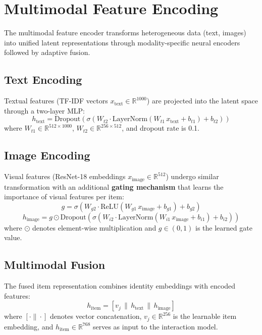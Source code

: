 \documentclass[12pt,a4paper]{report}
\begin{document}
{\section{Multimodal Feature Encoding}
The multimodal feature encoder transforms heterogeneous data (text, images) into unified latent representations through modality-specific neural encoders followed by adaptive fusion.

\subsection{Text Encoding}
Textual features (TF-IDF vectors $x_{\text{text}} \in \mathbb{R}^{1000}$) are projected into the latent space through a two-layer MLP:
\begin{equation}
h_{\text{text}} = \text{Dropout}(\sigma(W_{t2} \cdot \text{LayerNorm}(W_{t1} \, x_{\text{text}} + b_{t1}) + b_{t2}))
\end{equation}
where $W_{t1} \in \mathbb{R}^{512 \times 1000}$, $W_{t2} \in \mathbb{R}^{256 \times 512}$, and dropout rate is 0.1.

\subsection{Image Encoding}
Visual features (ResNet-18 embeddings $x_{\text{image}} \in \mathbb{R}^{512}$) undergo similar transformation with an additional \textbf{gating mechanism} that learns the importance of visual features per item:
\begin{equation}
g = \sigma(W_{g2} \cdot \text{ReLU}(W_{g1} \, x_{\text{image}} + b_{g1}) + b_{g2})
\end{equation}
\begin{equation}
h_{\text{image}} = g \odot \text{Dropout}(\sigma(W_{i2} \cdot \text{LayerNorm}(W_{i1} \, x_{\text{image}} + b_{i1}) + b_{i2}))
\end{equation}
where $\odot$ denotes element-wise multiplication and $g \in (0,1)$ is the learned gate value.

\subsection{Multimodal Fusion}
The fused item representation combines identity embeddings with encoded features:
\begin{equation}
h_{\text{item}} = [v_j \,\|\, h_{\text{text}} \,\|\, h_{\text{image}}]
\end{equation}
where $[\cdot\|\cdot]$ denotes vector concatenation, $v_j \in \mathbb{R}^{256}$ is the learnable item embedding, and $h_{\text{item}} \in \mathbb{R}^{768}$ serves as input to the interaction model.

}
\end{document}
